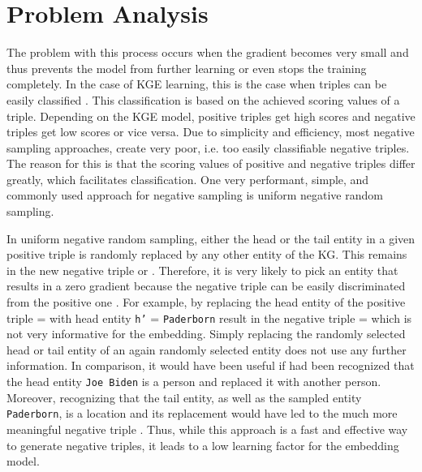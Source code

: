 \section{Problem Analysis}
\label{sec:problem_analysis}
The problem with this process occurs when the gradient becomes very small and thus prevents the model from further learning or even stops the training completely.
In the case of KGE learning, this is the case when triples can be easily classified \cite{zhang2021efficient}. 
This classification is based on the achieved scoring values of a triple.
Depending on the KGE model, positive triples get high scores and negative triples get low scores or vice versa. 
Due to simplicity and efficiency, most negative sampling approaches, create very poor, i.e. too easily classifiable negative triples. 
The reason for this is that the scoring values of positive and negative triples differ greatly, which facilitates classification. 
One very performant, simple, and commonly used approach for negative sampling is uniform negative random sampling.

In uniform negative random sampling, either the head or the tail entity in a given positive triple  is randomly replaced by any other entity of the \ac{KG}.
This remains in the new negative triple  or . 
Therefore, it is very likely to pick an entity that results in a zero gradient because the negative triple can be easily discriminated from the positive one \cite{cai2017kbgan}.
For example, by replacing the head entity of the positive triple  =  with head entity \texttt{h'} = \texttt{Paderborn} result in the negative triple  =   which is not very informative for the embedding.
Simply replacing the randomly selected head or tail entity of an again randomly selected entity does not use any further information.
In comparison, it would have been useful if had been recognized that the head entity \texttt{Joe Biden} is a person and replaced it with another person.
Moreover, recognizing that the tail entity, as well as the sampled entity \texttt{Paderborn}, is a location and its replacement would have led to the much more meaningful negative triple .  
Thus, while this approach is a fast and effective way to generate negative triples, it leads to a low learning factor for the embedding model.

